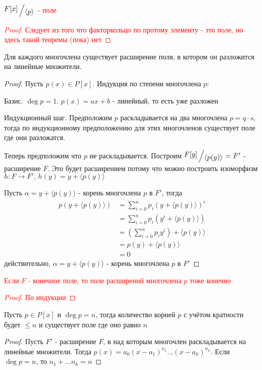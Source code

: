 \documentclass[../main/document.tex]{subfiles}
\begin{document}
\textcolor{red}{
\begin{cnsq}
$\bigslant{F[x]}{\langle p\rangle}$ - поле
\begin{proof}
Следует из того что факторкольцо по протому элементу - это поле, но здесь такой теоремы (пока) нет
\end{proof}
\end{cnsq}}
\begin{thm}
Для каждого многочлена существует расширение поля, в котором он разложится на линейные множители.
\begin{proof}
Пусть $p(x)\in P[x]$. Индукция по степени многочлена $p$:

Базис. $\deg p=1$. $p(x)=ax+b$ - линейный, то есть уже разложен

Индукционный шаг. Предположим $p$ раскладывается на два многочлена $p=q\cdot s$, тогда по индукционному предположению для этих многочленов существует поле где они разложатся. 

Теперь предположим что $p$ не раскладывается. Построим $\bigslant{F[y]}{\langle p(y)\rangle}=F'$ - расширение $F$. Это будет расширением потому что можно построить изоморфизм $h:F\to F',\,h(y)=y+\langle p(y)\rangle$

Пусть $\alpha = y+\langle p(y)\rangle$ - корень многочлена $p$ в $F'$, тогда
\begin{align*}
p(y+\langle p(y)\rangle)&=\sum\limits_{i=0}^np_i(y+\langle p(y)\rangle)^i\\
&=\sum\limits_{i=0}^np_i(y^i+\langle p(y)\rangle)\\
&=(\sum\limits_{i=0}^np_iy^i)+\langle p(y)\rangle\\
&=p(y)+\langle p(y)\rangle\\
&=0
\end{align*}
действительно, $\alpha = y+\langle p(y)\rangle$ - корень многочлена $p$ в $F'$
\end{proof}
\end{thm}
\begin{exm}

\end{exm}
\textcolor{red}{
\begin{cnsq}
Если $F$ - конечное поле, то поле расширений многочлена $p$ тоже конечно
\begin{proof}
По индукции
\end{proof}
\end{cnsq}}
\begin{cnsq}
Пусть $p\in P[x]$ и $\deg p =n$, тогда количество корней $p$ с учётом кратности будет $\leq n$ и существует поле где оно равно $n$
\begin{proof}
Пусть $F'$ - расширение $F$, в над которым многочлен раскладывается на линейные множители. Тогда $p(x)=a_0(x-a_1)^{n_1}...(x-a_k)^{n_k}$. Если $\deg p =n$, то $n_1+...n_k=n$
\end{proof}
\end{cnsq}
\end{document}
